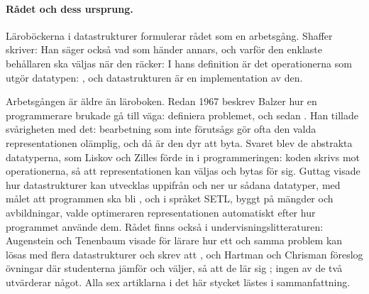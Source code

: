 \paragraph{Rådet och dess ursprung.}  Läroböckerna i datastrukturer
formulerar rådet som en arbetsgång.  Shaffer skriver:
  Han säger också vad som
händer annars, och varför den enklaste behållaren ska väljas när den
räcker:   I hans
definition är det operationerna som utgör datatypen:
, och
datastrukturen är en implementation av den.

Arbetsgången är äldre än läroboken.  Redan 1967 beskrev Balzer hur en
programmerare brukade gå till väga: definiera problemet, och sedan
.  Han tillade svårigheten med det: bearbetning som inte
förutsågs gör ofta den valda representationen olämplig, och då är den
dyr att byta.  Svaret blev de abstrakta datatyperna, som Liskov och
Zilles förde in i programmeringen\autocite{LiskovZilles1974}: koden
skrivs mot operationerna, så att representationen kan väljas och bytas
för sig.  Guttag visade hur datastrukturer kan utvecklas uppifrån och
ner ur sådana datatyper, med målet att programmen ska bli
, och i
språket SETL, byggt på mängder och avbildningar, valde optimeraren
representationen automatiskt efter hur programmet använde
dem\autocite{Schwartz1975SETL}.  Rådet finns också i
undervisningslitteraturen: Augenstein och Tenenbaum visade för lärare
hur ett och samma problem kan lösas med flera datastrukturer och skrev
att , och Hartman och Chrisman föreslog övningar där studenterna
jämför och väljer, så att de lär sig
; ingen av de två utvärderar något.  Alla sex artiklarna i
det här stycket lästes i sammanfattning.

